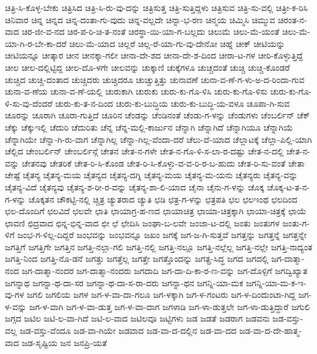 {ಚಿತ್ರಿ-ಸಿ-ಕೊಳ್ಳ-ಬೇಕು
ಚಿತ್ರಿಸಿದ
ಚಿತ್ರಿ-ಸಿ-ರು-ವು-ದನ್ನು
ಚಿತ್ರಿಸುತ್ತ
ಚಿತ್ರಿ-ಸುತ್ತಿದ್ದಳು
ಚಿತ್ರಿಸುವ
ಚಿತ್ರಿ-ಸು-ವಲ್ಲಿ
ಚಿತ್ರೀ-ಕ-ರಿಸಿ
ಚಿನಿವಾರ
ಚಿನ್ನ
ಚಿನ್ನದ
ಚಿನ್ನ-ದಂತಾ-ಗು-ವುದು
ಚಿನ್ನ-ವಲ್ಲದೇ
ಚಿನ್ನಾ-ಭ-ರಣ
ಚಿನ್ಮಯ
ಚಿಮ್ಮಿಸಿ
ಚಿಮ್ಮುವ
ಚಿರಂತ-ನ-ವಾದ
ಚಿರ-ಜೀ-ವ-ನದ
ಚಿರ-ಪ-ರಿ-ಚಿ-ತ-ನಂತೆ
ಚಿರಸ್ಥಾ-ಯಿ-ಯಾ-ಗ-ಬಲ್ಲದು
ಚಿಲುಮೆ
ಚಿಲು-ಮೆ-ಯಂತೆ
ಚಿಲು-ಮೆ-ಯಾ-ಗಿ-ರ-ಬೇ-ಕಾ-ದರೆ
ಚಿಲು-ಮೆ-ಯಾದ
ಚಿಲ್ಲರೆ
ಚಿಲ್ಲ-ರೆ-ಯಾ-ಗು-ವು-ದೇನೋ
ಚಿಹ್ನೆ
ಚೀಕ್
ಚೀಟಿಯನ್ನು
ಚೀಟಿಯನ್ನೂ
ಚೀತ್ಕಾರ
ಚೀನ
ಚೀನಕ್ಕಾ-ಗಲೀ
ಚೀನಾ-ದೇ-ಶದ
ಚೀನಾ-ದೇ-ಶ-ದಿಂದ
ಚೀರಾ-ಟ-ಗಳ
ಚೀರಿ-ಕೊಳ್ಳುತ್ತಿದ್ದೆ
ಚೀಲ
ಚೀಲ-ದಲ್ಲಿಟ್ಟಿದ್ದ
ಚೀಲ-ದೊ-ಳಗೇ
ಚೀಲವನ್ನು
ಚುಕ್ಕಾಣಿ
ಚುಕ್ಕೆಗಳೂ
ಚುಚ್ಚದಂತೆ
ಚುಚ್ಚಿ
ಚುಚ್ಚಿ-ಕೊಂಡರೆ
ಚುಚ್ಚಿದ
ಚುಚ್ಚಿ-ದಂತಾದ
ಚುಚ್ಚಿದರು
ಚುಚ್ಚಿದರೂ
ಚುಚ್ಚುತ್ತಿತ್ತು
ಚುನಾವಣೆ
ಚುನಾ-ವ-ಣೆ-ಗ-ಳು-ಅ-ದ-ರಿಂದಾ-ಗುವ
ಚುನಾ-ವ-ಣೆಯ
ಚುನಾ-ವ-ಣೆ-ಯಲ್ಲಿ
ಚುರುಕಾಗಿ
ಚುರುಕು
ಚುರು-ಕು-ಗೊ-ಳಿಸಿ
ಚುರು-ಕು-ಗೊ-ಳಿಸು
ಚುರು-ಕು-ಗೊ-ಳಿ-ಸು-ವು-ದೆಂದರೆ
ಚುರು-ಕು-ತ-ನ-ದಿಂದ
ಚುರು-ಕು-ಬುದ್ಧಿಯ
ಚುರು-ಕು-ಬುದ್ಧಿ-ಯ-ವಳೂ
ಚೂಪಾ-ಗಿ-ಸುವ
ಚೂರನ್ನು
ಚೂರಾಗಿ
ಚೂರಾ-ಗುತ್ತಿದೆ
ಚೂರಿನ
ಚೆಂಡನ್ನು
ಚೆಂಡಿನಂತೆ
ಚೆಂಡು-ಗ-ಳನ್ನು
ಚೆಂಡುಗಳು
ಚೆಂಬರ್ಲಿನ್
ಚೆಕ್
ಚೆಕ್ಕು
ಚೆಕ್ಕುಇಲ್ಲಿ
ಚೆದುರಿ
ಚೆದುರಿತು
ಚೆನ್ನ
ಚೆನ್ನ-ಮಲ್ಲಿ-ಕಾರ್ಜುನ
ಚೆನ್ನಾಗಿ
ಚೆನ್ನಾಗಿದೆ
ಚೆನ್ನಾಗಿಯೂ
ಚೆನ್ನಾಗಿಯೆ
ಚೆನ್ನಾಗಿಯೇ
ಚೆನ್ನಾ-ಗಿ-ರು-ವಾಗ
ಚೆನ್ನಾಗಿಲ್ಲ
ಚೆನ್ನಾ-ಗಿಲ್ಲ-ವೆಂದಾ-ದರೆ
ಚೆಲು-ವೆ-ಯಾದ
ಚೆಲ್ಲಾಟಕ್ಕೆ
ಚೆಲ್ಲಾ-ಪಿಲ್ಲಿ-ಯಾಗಿ
ಚೆಲ್ಲಿದ
ಚೇಂಬರ್ಲಿನ್
ಚೇಂಬರ್ಲಿನ್ಗೆ
ಚೇತನ
ಚೇತ-ನ-ಗಳೇ
ಚೇತ-ನ-ಗೊ-ಳಿ-ಸ-ಲಾ-ರ-ದಷ್ಟು
ಚೇತ-ನ-ದಲ್ಲಿ
ಚೇತ-ನ-ವನ್ನು
ಚೇತನವು
ಚೇತರಿಕೆ
ಚೇತ-ರಿ-ಸಿ-ಕೊಂಡ
ಚೇತ-ರಿ-ಸಿ-ಕೊಳ್ಳು-ವ-ವ-ರಿ-ರ-ಬ-ಹುದು
ಚೇತ-ರಿ-ಸು-ವಂತೆ
ಚೇತಾ
ಚೇಷ್ಟೆ
ಚೈತನ್ಯ
ಚೈತನ್ಯ-ಮಯ
ಚೈತನ್ಯದ
ಚೈತನ್ಯ-ದಗ್ನಿ
ಚೈತನ್ಯ-ಮಯ
ಚೈತನ್ಯ-ಮ-ಯನು
ಚೈತನ್ಯರು
ಚೈತನ್ಯ-ವನ್ನು
ಚೈತನ್ಯ-ವಿದೆ
ಚೈತನ್ಯವು
ಚೈತನ್ಯ-ಶ-ರೀ-ರ-ವನ್ನು
ಚೈತನ್ಯ-ಶಾ-ಲಿ-ಯಾದ
ಚೈನಾ
ಚೈನು-ಗ-ಳನ್ನು
ಚೊಕ್ಕ
ಚೊಕ್ಕ-ಟ-ತ-ನ-ಗ-ಳನ್ನು
ಚೊಕ್ಕತನ
ಚೌಕಟ್ಟಿ-ನಲ್ಲಿ
ಚ್ಚಿತ್ರ
ಚ್ಯುತರಾದ
ಚ್ಯುತಿ
ಛಡಿ
ಛತ್ರ-ಗ-ಳನ್ನು
ಛತ್ರಪತಿ
ಛಲ
ಛಲಇಂಥ
ಛಲದಿಂದ
ಛಲ-ದೊಂದಿಗೆ
ಛಲವಿದೆ
ಛಲವೇ
ಛಾತಿ
ಛಾಯಾಗ್ರ-ಹ-ಣದ
ಛಾಯಾಚಿತ್ರ
ಛಾಯಾ-ಚಿತ್ರಕ್ಕಾಗಿ
ಛಾಯಾ-ಚಿತ್ರಕ್ಕೆ
ಛಾಯೆ
ಛಾವಣಿ
ಛಿದ್ರವಾದ
ಛಿನ್ನ-ಭಿನ್ನ-ವಾದ
ಛೀ
ಛೆ
ಛೇದಿಸಿ
ಜಂಘಾ-ಬ-ಲವೇ
ಜಂಜಾ-ಟ-ದಲ್ಲಿ
ಜಂತು
ಜಂತುಗಳ
ಜಂತು-ಗ-ಳಿಗೆ
ಜಂಭ-ಗ-ಳಿಲ್ಲ-ದಿದ್ದರೆ
ಜಂಭವನ್ನು
ಜಂಭವನ್ನೂ
ಜಖಂ
ಜಗಕ್ಕೆ
ಜಗ-ಜ-ಗಿ-ಸುತ್ತವೆ
ಜಗತ್ತನ್ನು
ಜಗತ್ತನ್ನೆ
ಜಗತ್ತನ್ನೇ
ಜಗತ್ತಿಗೆ
ಜಗತ್ತಿಗೇ
ಜಗತ್ತಿನ
ಜಗತ್ತಿ-ನಲ್ಲಾ-ಗಲಿ
ಜಗತ್ತಿ-ನಲ್ಲಿ
ಜಗತ್ತಿ-ನಲ್ಲೂ
ಜಗತ್ತಿ-ನಲ್ಲೆಲ್ಲ
ಜಗತ್ತಿ-ನಲ್ಲೇ
ಜಗತ್ತಿ-ನಾದ್ಯಂತ
ಜಗತ್ತಿ-ನಿಂದ
ಜಗತ್ತಿ-ನೊ-ಡನೆ
ಜಗತ್ತು
ಜಗತ್ತೆಲ್ಲ
ಜಗತ್ತೇ
ಜಗತ್ತೊಂದನ್ನು
ಜಗತ್ಪ್ರ-ಸಿದ್ಧ
ಜಗದ
ಜಗದಲ್ಲಿ
ಜಗ-ದಾತ್ಮಾ-ನಂದ
ಜಗ-ದಾತ್ಮಾ-ನಂದರ
ಜಗ-ದಾತ್ಮಾ-ನಂದರು
ಜಗದಾದಿ
ಜಗ-ದಾ-ದಿ-ಕಾ-ರ-ಣ-ವನ್ನು
ಜಗ-ದೊಳ್ಪಿಗೆ
ಜಗದ್ವಿಖ್ಯಾತ
ಜಗನ್ನಾಥ
ಜಗನ್ನಾ-ಥ-ದಾ-ಸರ
ಜಗನ್ನಾ-ಥ-ದಾ-ಸ-ರಾ-ದರು
ಜಗನ್ನಾ-ಥನ
ಜಗನ್ನಿ-ಯಾ-ಮಕ
ಜಗನ್ನಿ-ಯಾ-ಮ-ಕ-ಇ-ವು-ಗಳ
ಜಗಲಿ
ಜಗಲಿಯ
ಜಗಳ
ಜಗ-ಳ-ವಾ-ದಾ-ಗಲೂ
ಜಗ-ಳಕ್ಕಾಗಿ
ಜಗ-ಳ-ಗಂಟರು
ಜಗ-ಳ-ದಿಂದುಂಟಾ-ಗಿದ್ದ
ಜಗ-ಳ-ವನ್ನು
ಜಗ-ಳ-ವಾಗಿ
ಜಗ-ಳ-ವಾ-ಡುತ್ತ
ಜಗ-ಳ-ವಾ-ದಾಗ
ಜಗಳಾಡಿ
ಜಗ-ಳಾ-ಡುತ್ತಲೇ
ಜಗ-ಳಾ-ಡುತ್ತಿದ್ದಾರೆ
ಜಗುಲಿ
ಜಗ್ಗದ
ಜಟಿಲ
ಜಟಿ-ಲ-ವಾ-ಗಿದೆ
ಜಟಿ-ಲ-ವಾದ
ಜಟಿಲವೂ
ಜಟ್ಟಿಗಳು
ಜಡ
ಜಡತೆ
ಜಡರಾಗ
ಜಡವನು
ಜಡ-ವಸ್ತು-ವಲ್ಲ
ಜಡ-ವಸ್ತು-ವೆಂದೂ
ಜಡ-ವಾ-ಗಿಯೇ
ಜಡವಾದ
ಜಡ-ವಾ-ದ-ದಲ್ಲಿನ
ಜಡ-ವಾ-ದದ
ಜಡ-ವಾ-ದ-ದೇ-ಹಾತ್ಮ-ವಾದ
ಜಡ-ಸೃಷ್ಟಿಯ
ಜನ
ಜನಪ್ರಿ-ಯತೆ
}
